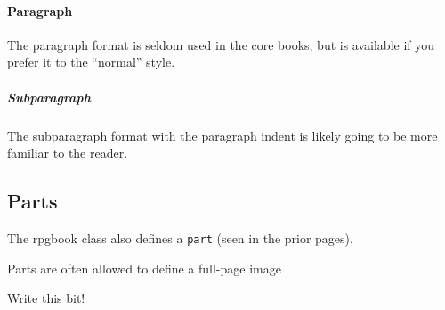 					\paragraph{Paragraph}
					The paragraph format is seldom used in the core books, but is available if you prefer it to the ``normal'' style.

					\subparagraph{Subparagraph}
					The subparagraph format with the paragraph indent is likely going to be more familiar to the reader.
			\subsection{Parts}

				The rpgbook class also defines a \verb|part| (seen in the prior pages).

				Parts are often allowed to define a full-page image

				{\color{red} Write this bit!}












